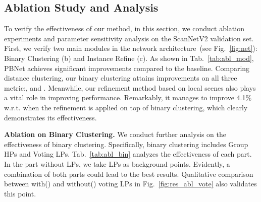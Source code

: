 \documentclass[10pt,twocolumn,letterpaper]{article}
\begin{document}
\subsection{Ablation Study and Analysis}
\begin{table}[b]
\centering
{}
	\caption{Ablation Study on Network Module.}
\label{tab:abl_mod}
\end{table}
To verify the effectiveness of our method, in this section, we conduct ablation experiments and parameter sensitivity analysis on the ScanNetV2 validation set. First, we verify two main modules in the network architecture~(see Fig.~\ref{fig:net}): Binary Clustering (b) and Instance Refine (c). As shown in Tab.~\ref{tab:abl_mod}, PBNet achieves significant improvements compared to the baseline. Comparing distance clustering, our binary clustering attains improvements on all three metric:,  and . Meanwhile, our refinement method based on local scenes also plays a vital role in  improving  performance. Remarkably, it manages to improve 4.1\% w.r.t.  when the refinement is applied on top of binary clustering, which clearly demonstrates its effectiveness. 

\noindent\textbf{Ablation on Binary Clustering.}
We conduct further analysis on the effectiveness of binary clustering. Specifically, binary clustering includes Group HPs and Voting LPs. Tab.~\ref{tab:abl_bin} analyzes the effectiveness of each part. In the part without LPs, we take LPs as background points. Evidently, a combination of both parts could lead to the best results.  Qualitative comparison between with() and without() voting LPs in Fig.~\ref{fig:res_abl_vote} also validates this point. 
\begin{table}[ht]
\centering
	\caption{Ablation Study on Binary Clustering.}
\label{tab:abl_bin}
\end{table}
\end{document}
